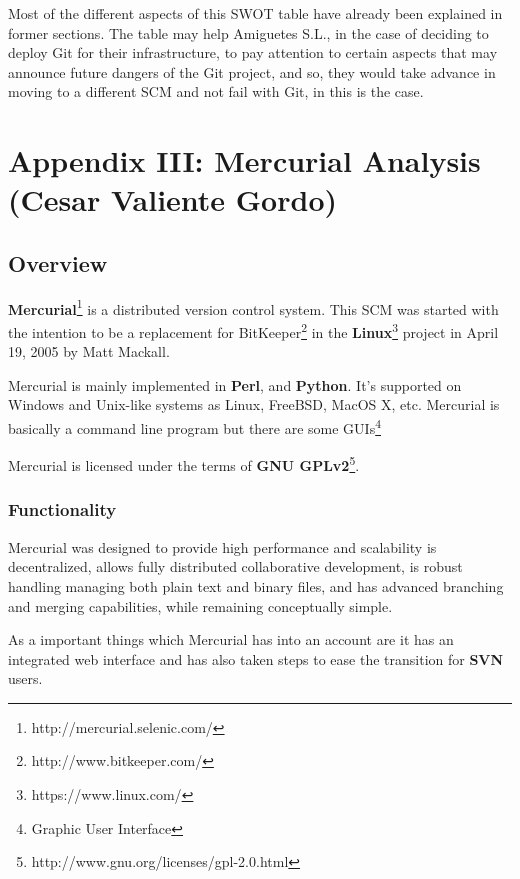 \documentclass[a4paper,10pt]{article}
\begin{document}
Most of the different aspects of this SWOT table have already been explained in
former sections. The table may help Amiguetes S.L., in the case of deciding
to deploy Git for their infrastructure, to pay attention to certain aspects
that may announce future dangers of the Git project, and so, they would take
advance in moving to a different SCM and not fail with Git, in this is the case.

\newpage

\section{Appendix III: Mercurial Analysis (Cesar Valiente Gordo)}
\label{Mercurial Appendix}

\subsection{Overview} \label{Overview}

\textbf{Mercurial}\footnote{http://mercurial.selenic.com/} is a distributed
version control system.
This SCM was started with the intention to be a replacement for
BitKeeper\footnote{http://www.bitkeeper.com/} in the
\textbf{Linux}\footnote{https://www.linux.com/} project in April 19, 2005 by
Matt Mackall.

Mercurial is mainly implemented in \textbf{Perl}, and \textbf{Python}. It's
supported on Windows and Unix-like systems as Linux, FreeBSD, MacOS X, etc.
Mercurial is basically a command line program but there are some
GUIs\footnote{Graphic User Interface} 

Mercurial is licensed under the terms of \textbf{GNU
GPLv2}\footnote{http://www.gnu.org/licenses/gpl-2.0.html}.

\subsubsection{Functionality} \label{Functionality}

Mercurial was designed to provide high performance and scalability is
decentralized, allows fully distributed collaborative development, is robust
handling managing both plain text and binary files, and has advanced branching
and merging capabilities, while remaining conceptually simple.

As a important things which Mercurial has into an account are it has an
integrated web interface and has also taken steps to ease the transition for
\textbf{SVN} users.
\end{document}
